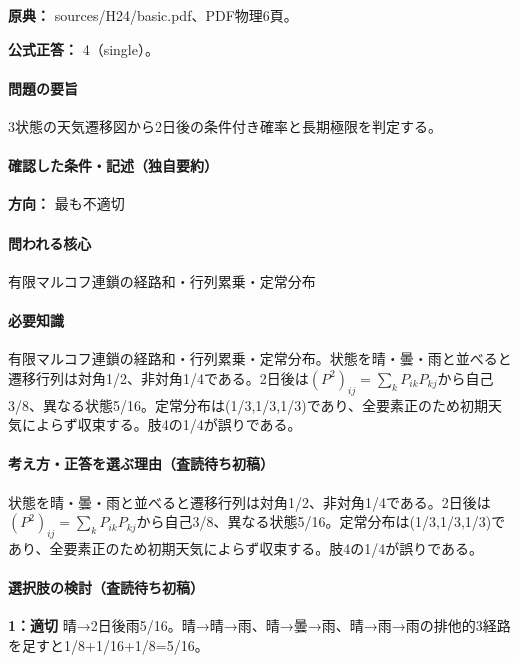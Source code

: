 \noindent\textbf{原典：} sources/H24/basic.pdf、PDF物理6頁。

\textbf{公式正答：} 4（single）。

\paragraph{問題の要旨} 3状態の天気遷移図から2日後の条件付き確率と長期極限を判定する。

\paragraph{確認した条件・記述（独自要約）}\mbox{}\par

\noindent\textbf{方向：} 最も不適切\par

\paragraph{問われる核心} 有限マルコフ連鎖の経路和・行列累乗・定常分布

\paragraph{必要知識} 有限マルコフ連鎖の経路和・行列累乗・定常分布。状態を晴・曇・雨と並べると遷移行列は対角1/2、非対角1/4である。2日後は\((P^2)_{ij}=\sum_kP_{ik}P_{kj}\)から自己3/8、異なる状態5/16。定常分布は(1/3,1/3,1/3)であり、全要素正のため初期天気によらず収束する。肢4の1/4が誤りである。

\paragraph{考え方・正答を選ぶ理由（査読待ち初稿）} 状態を晴・曇・雨と並べると遷移行列は対角1/2、非対角1/4である。2日後は\((P^2)_{ij}=\sum_kP_{ik}P_{kj}\)から自己3/8、異なる状態5/16。定常分布は(1/3,1/3,1/3)であり、全要素正のため初期天気によらず収束する。肢4の1/4が誤りである。

\paragraph{選択肢の検討（査読待ち初稿）}\mbox{}\par

\noindent\textbf{1：適切} 晴→2日後雨5/16。晴→晴→雨、晴→曇→雨、晴→雨→雨の排他的3経路を足すと1/8+1/16+1/8=\allowbreak{}5/16。\par

